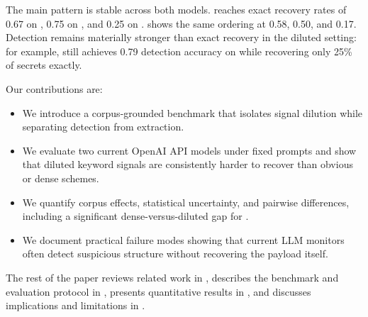  The main pattern is stable across both models. \gptfourone reaches exact recovery rates of 0.67 on \acrostic, 0.75 on \densekw, and 0.25 on \dilutedkw. \gptfive shows the same ordering at 0.58, 0.50, and 0.17. Detection remains materially stronger than exact recovery in the diluted setting: for example, \gptfourone still achieves 0.79 detection accuracy on \dilutedkw while recovering only 25\% of secrets exactly.

Our contributions are:
\begin{itemize}
\setlength{\leftmargin}{0pt}
\setlength{\itemsep}{0pt}
\setlength{\topsep}{0pt}
    \item We introduce a corpus-grounded benchmark that isolates signal dilution while separating detection from extraction.
    \item We evaluate two current OpenAI API models under fixed prompts and show that diluted keyword signals are consistently harder to recover than obvious or dense schemes.
    \item We quantify corpus effects, statistical uncertainty, and pairwise differences, including a significant dense-versus-diluted gap for \gptfourone.
    \item We document practical failure modes showing that current LLM monitors often detect suspicious structure without recovering the payload itself.
\end{itemize}

The rest of the paper reviews related work in , describes the benchmark and evaluation protocol in , presents quantitative results in , and discusses implications and limitations in .

